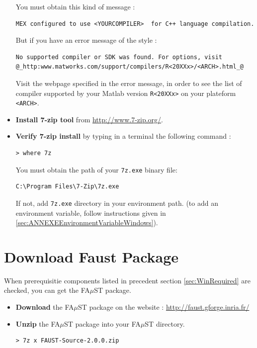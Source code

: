 \begin{itemize}
You must obtain this kind of message :
\begin{lstlisting}
MEX configured to use <YOURCOMPILER>  for C++ language compilation.
\end{lstlisting}

But if you have an error message of the style :
\begin{lstlisting}[moredelim={**[is][\color{blue}]{@}{@}},moredelim={[is][\underbar]{_}{_}}]
No supported compiler or SDK was found. For options, visit 
@_http:www.matworks.com/support/compilers/R<20XXx>/<ARCH>.html_@
\end{lstlisting}
Visit the webpage specified in the error message,
in order to see the list of compiler supported by your Matlab version \texttt{R<20XXx>} on your plateform \texttt{<ARCH>}.

\item \textbf{Install 7-zip tool} from \url{http://www.7-zip.org/}. 

\item \textbf{Verify 7-zip install} by typing in a terminal the following command : 
\lstset{style=customBash}
\begin{lstlisting}
> where 7z
\end{lstlisting}
You must obtain the path of your \texttt{7z.exe} binary file: 
\begin{lstlisting}
C:\Program Files\7-Zip\7z.exe
\end{lstlisting}
If not, add \texttt{7z.exe} directory in your environment path. 
(to add an environment variable, follow instructions given in \ref{sec:ANNEXEEnvironmentVariableWindows}). 

\end{itemize}

\section{Download Faust Package}\label{sec:WinDownload}
When prerequisitie components listed in precedent section \ref{sec:WinRequired} are checked, you can get the FA$\mu$ST package.
\begin{itemize}
\item \textbf{Download} the FA$\mu$ST package on the website : \url{http://faust.gforge.inria.fr/}
\item \textbf{Unzip} the FA$\mu$ST package into your FA$\mu$ST directory. 
\lstset{style=customBash}
\begin{lstlisting}
> 7z x FAUST-Source-2.0.0.zip
\end{lstlisting}
\end{itemize}



